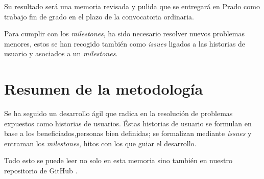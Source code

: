 Su resultado será una memoria revisada y pulida que se entregará en Prado como trabajo fin de grado en el plazo de la convocatoria ordinaria. 

Para cumplir con los \textit{milestones},  ha sido necesario resolver nuevos  problemas menores, estos se han
recogido también como \textit{issues} ligados a las historias de usuario y asociados a un  \textit{milestones}.


\section{Resumen de la metodología}  

Se ha seguido un desarrollo ágil que radica en la resolución de problemas expuestos como historias de usuarios. 
Éstas historias de usuario se formulan en base a los beneficiados,personas bien definidas; se formalizan 
mediante \textit{issues} y entraman los \textit{milestones}, hitos con los que guiar el desarrollo.

Todo esto se puede leer no solo en esta memoria sino también en nuestro repositorio de GitHub \cite{TFG-Estudio-de-las-redes-neuronales}. 
 




